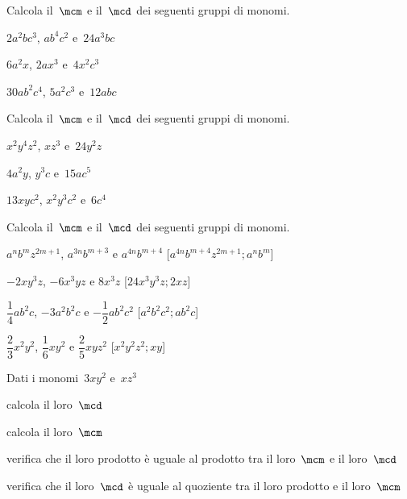 \begin{esercizio}
 \label{ese:9.46}
Calcola il~$\mcm$ e il~$\mcd$ dei seguenti gruppi di monomi.

\begin{enumeratea}
 \item $2a^{2}bc^{3}$, $ab^{4}c^{2}$ e~$24a^{3}bc$
 \item $6a^{2}x$, $2ax^{3}$ e~$4x^{2}c^{3}$
 \item $30ab^{2}c^{4}$, $5a^{2}c^{3}$ e~$12abc$
\end{enumeratea}
\end{esercizio}

\begin{esercizio}
 \label{ese:9.47}
Calcola il~$\mcm$ e il~$\mcd$ dei seguenti gruppi di monomi.

\begin{enumeratea}
 \item $x^{2}y^{4}z^{2}$, $xz^{3}$ e~$24y^{2}z$
 \item $4a^{2}y$, $y^{3}c$ e~$15ac^{5}$
 \item $13xyc^{2}$, $x^{2}y^{3}c^{2}$ e~$6c^{4}$
\end{enumeratea}
\end{esercizio}

\begin{esercizio}[\Ast]
 \label{ese:9.48}
Calcola il~$\mcm$ e il~$\mcd$ dei seguenti gruppi di monomi.

\begin{enumeratea}
 \item $a^{n}b^{m}z^{2m+1}$, \quad $a^{3n}b^{m+3}$ \quad e \quad 
$a^{4n}b^{m+4}$ 
 \hfill[$a^{4n}b^{m+4}z^{2m+1}; a^{n}b^{m}$]
 \item $-2xy^{3}z$, \quad $-6x^{3}yz$ \quad e \quad $8x^{3}z$ 
 \hfill[$24x^{3}y^{3}z; 2xz$]
 \item $\dfrac{1}{4}ab^{2}c$, \quad $-3a^{2}b^{2}c$ \quad e \quad 
$-{\dfrac{1}{2}}ab^{2}c^{2}$ 
 \hfill[$a^{2}b^{2}c^{2};ab^{2}c$]
 \item $\dfrac{2}{3}x^{2}y^{2}$, \quad $\dfrac{1}{6}xy^{2}$ \quad e \quad 
$\dfrac{2}{5}xyz^{2}$ 
 \hfill[$x^{2}y^{2}z^{2};xy$]
\end{enumeratea}
\end{esercizio}

\begin{esercizio}
 \label{ese:9.49}
Dati i monomi~$3xy^{2}$ e~$xz^{3}$

\begin{enumeratea}
\item calcola il loro~$\mcd$
\item calcola il loro~$\mcm$
\item verifica che il loro prodotto è uguale al prodotto tra il loro~$\mcm$ e il 
loro~$\mcd$
\item verifica che il loro~$\mcd$ è uguale al quoziente tra il loro prodotto e 
il loro~$\mcm$
\end{enumeratea}
\end{esercizio}

